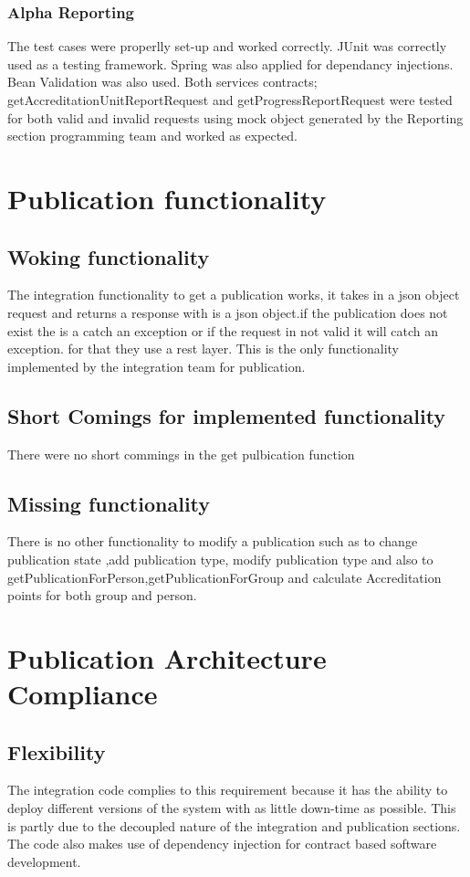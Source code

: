 \documentclass{article}
\begin{document}
	\subsubsection{Alpha Reporting}
	The test cases were properlly set-up and worked correctly. JUnit was correctly used as a testing framework. Spring was also applied for dependancy injections. Bean Validation was also used. Both services contracts; getAccreditationUnitReportRequest and getProgressReportRequest were tested for both valid and invalid requests using mock object generated by the Reporting section programming team and worked as expected. \\
  
  \section{Publication functionality}
  	\subsection{Woking functionality}
		The integration functionality to get a publication works, it takes in a json object request and returns a response with is a json object.if the publication does not exist the is a catch an exception or if the request in not valid it will catch an exception. for that they use a rest layer. This is the only functionality implemented by the integration team for publication.
	\subsection{Short Comings for implemented functionality}
		There were no short commings in the get pulbication function

	\subsection{Missing functionality}
		There is no other functionality to modify a publication such as to change publication state ,add publication type, modify publication type and also to getPublicationForPerson,getPublicationForGroup and calculate Accreditation points for both group and person.
		
\section{Publication Architecture Compliance}
    \subsection{Flexibility}
    The integration code complies to this requirement because it has the ability to deploy different versions of the system with as little down-time as possible. This is partly due to the decoupled nature of the integration and publication sections. The code also makes use of dependency injection for contract based software development.
    
\end{document}
